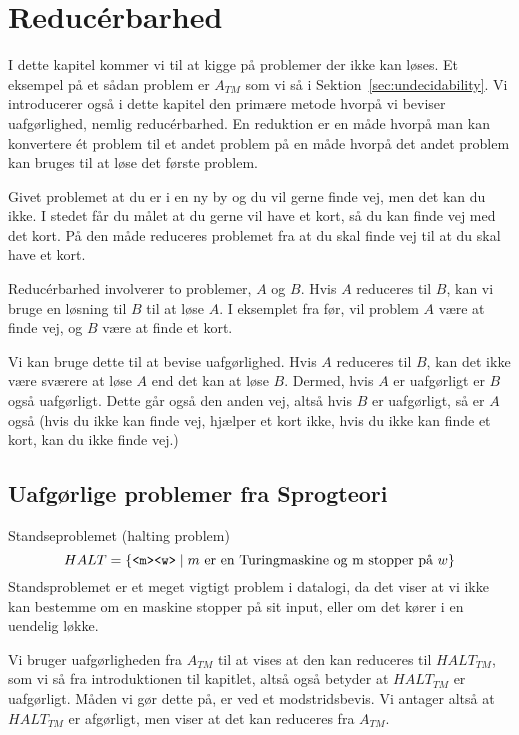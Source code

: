 \chapter{Reducérbarhed}

I dette kapitel kommer vi til at kigge på problemer der ikke kan løses. Et eksempel på et sådan problem er $A_{TM}$ som vi så i Sektion~\ref{sec:undecidability}. Vi introducerer også i dette kapitel den primære metode hvorpå vi beviser uafgørlighed, nemlig reducérbarhed. En reduktion er en måde hvorpå man kan konvertere ét problem til et andet problem på en måde hvorpå det andet problem kan bruges til at løse det første problem.

Givet problemet at du er i en ny by og du vil gerne finde vej, men det kan du ikke. I stedet får du målet at du gerne vil have et kort, så du kan finde vej med det kort. På den måde reduceres problemet fra at du skal finde vej til at du skal have et kort.

Reducérbarhed involverer to problemer, $A$ og $B$. Hvis $A$ reduceres til $B$, kan vi bruge en løsning til $B$ til at løse $A$. I eksemplet fra før, vil problem $A$ være at finde vej, og $B$ være at finde et kort.

Vi kan bruge dette til at bevise uafgørlighed. Hvis $A$ reduceres til $B$, kan det ikke være sværere at løse $A$ end det kan at løse $B$. Dermed, hvis $A$ er uafgørligt er $B$ også uafgørligt. Dette går også den anden vej, altså hvis $B$ er uafgørligt, så er $A$ også (hvis du ikke kan finde vej, hjælper et kort ikke, hvis du ikke kan finde et kort, kan du ikke finde vej.)

\section{Uafgørlige problemer fra Sprogteori}%
\label{sec:uafgørligsprogteri}

Standseproblemet (halting problem) $$HALT = \{\text{\texttt{<m><w>}} \mid m \text{ er en Turingmaskine og m stopper på }w\}$$
Standsproblemet er et meget vigtigt problem i datalogi, da det viser at vi ikke kan bestemme om en maskine stopper på sit input, eller om det kører i en uendelig løkke.

Vi bruger uafgørligheden fra $A_{TM}$ til at vises at den kan reduceres til $HALT_{TM}$, som vi så fra introduktionen til kapitlet, altså også betyder at $HALT_{TM}$ er uafgørligt. Måden vi gør dette på, er ved et modstridsbevis. Vi antager altså at $HALT_{TM}$ er afgørligt, men viser at det kan reduceres fra $A_{TM}$.

